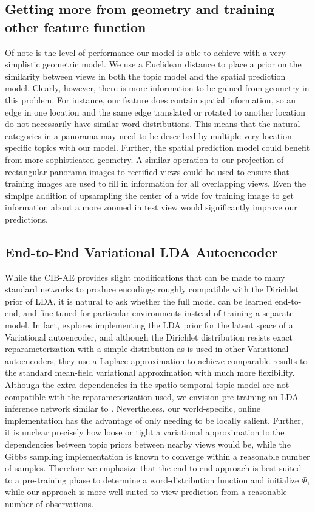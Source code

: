 \subsection{Getting more from geometry and training other feature function}
Of note is the level of performance our model is able to achieve with a very simplistic geometric model. We use a Euclidean distance to place a prior on the similarity between views in both the topic model and the spatial prediction model. Clearly, however, there is more information to be gained from geometry in this problem. For instance, our feature does contain spatial information, so an edge in one location and the same edge translated or rotated to another location do not necessarily have similar word distributions. This means that the natural categories in a panorama may need to be described by multiple very location specific topics with our model. Further, the spatial prediction model could benefit from more sophisticated geometry. A similar operation to our projection of rectangular panorama images to rectified views could be used to ensure that training images are used to fill in information for all overlapping views. Even the simplpe addition of upsampling the center of a wide fov training image to get information about a more zoomed in test view would significantly improve our predictions.

\subsection{End-to-End Variational LDA Autoencoder}
While the CIB-AE provides slight modifications that can be made to many standard networks to produce encodings roughly compatible with the Dirichlet prior of LDA, it is natural to ask whether the full model can be learned end-to-end, and fine-tuned for particular environments instead of training a separate model. In fact, \citep{srivastava2017autoencoding} explores implementing the LDA prior for the latent space of a Variational autoencoder, and although the Dirichlet distribution resists exact reparameterization with a simple distribution as is used in other Variational autoencoders, they use a Laplace approximation to achieve comparable results to the standard mean-field variational approximation with much more flexibility. Although the extra dependencies in the spatio-temporal topic model are not compatible with the reparameterization used, we envision pre-training an LDA inference network similar to \citet{srivastava2017autoencoding}. Nevertheless, our world-specific, online implementation has the advantage of only needing to be locally salient. Further, it is unclear precisely how loose or tight a variational approximation to the dependencies between topic priors between nearby views would be, while the Gibbs sampling implementation is known to converge within a reasonable number of samples. Therefore we emphasize that the end-to-end approach is best suited to a pre-training phase to determine a word-distribution function and initialize $\Phi$, while our approach is more well-suited to view prediction from a reasonable number of observations.